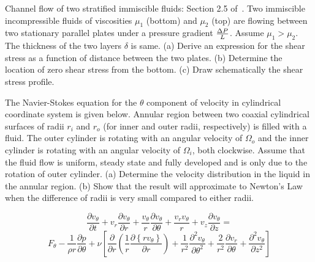 
\begin{question}
Channel flow of two stratified immiscible fluids: Section 2.5 of~\cite{bls}. Two immiscible incompressible fluids of viscosities $\mu_1$ (bottom) and $\mu_2$ (top) are flowing between two stationary parallel plates under a pressure gradient $\Delta P \over L$. Assume $\mu_1 > \mu_2$. The thickness of the two layers $\delta$ is same. (a) Derive an expression for the shear stress as a function of distance between the two plates. (b) Determine the location of zero shear stress from the bottom. (c) Draw schematically the shear stress profile.
\end{question}
\begin{solution}[print]
\end{solution}


\begin{question}

The Navier-Stokes equation for the $\theta$ component of velocity in cylindrical coordinate system is given below. Annular region between two coaxial cylindrical surfaces of radii $r_i$ and $r_o$ (for inner and outer radii, respectively) is filled with a fluid. The outer cylinder is rotating with an angular velocity of $\Omega_o$ and the inner cylinder is rotating with an angular velocity of $\Omega_i$, both clockwise. Assume that the fluid flow is uniform, steady state and fully developed and is only due to the rotation of outer cylinder. (a) Determine the velocity distribution in the liquid in the annular region. (b) Show that the result will approximate to Newton's Law when the difference of radii is very small compared to either radii.

$$\frac{\partial v_\theta}{\partial t} + v_r \frac{\partial v_\theta}{\partial r} + \frac{v_\theta}{r} \frac{\partial v_\theta}{\partial \theta} + \frac{v_r v_\theta}{r} + v_z \frac{\partial v_\theta}{\partial z} = $$
$$ F_\theta -\frac{1}{\rho r}\frac{\partial p}{\partial \theta} \nonumber + \nu \left[ \frac{\partial}{\partial r}\left(\frac{1}{r} \frac{\partial \left\{rv_\theta\right\}}{\partial r} \right) + \frac{1}{r^2}\frac{\partial^2 v_\theta}{\partial \theta^2} + \frac{2}{r^2}\frac{\partial v_r}{\partial \theta} + \frac{\partial^2 v_\theta}{\partial z^2} \right] $$

\end{question}

